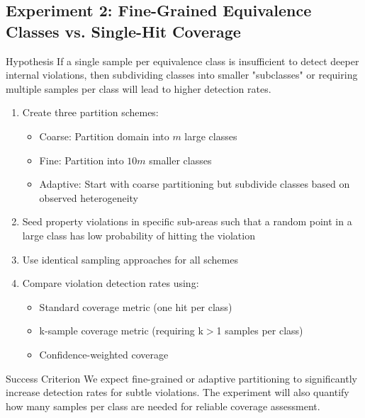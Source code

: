 \documentclass[11pt,a4paper]{article}
\begin{document}
\subsection{Experiment 2: Fine-Grained Equivalence Classes vs. Single-Hit Coverage}

\begin{theorembox}{Hypothesis}
If a single sample per equivalence class is insufficient to detect deeper internal violations, then subdividing classes into smaller "subclasses" or requiring multiple samples per class will lead to higher detection rates.
\end{theorembox}

\begin{tcolorbox}[
  colback=blue!5!white,
  colframe=blue!75!black,
  title=Experimental Design,
  fonttitle=\bfseries
]
\begin{enumerate}
\item Create three partition schemes:
   \begin{itemize}
   \item Coarse: Partition domain into $m$ large classes
   \item Fine: Partition into $10m$ smaller classes
   \item Adaptive: Start with coarse partitioning but subdivide classes based on observed heterogeneity
   \end{itemize}
\item Seed property violations in specific sub-areas such that a random point in a large class has low probability of hitting the violation
\item Use identical sampling approaches for all schemes
\item Compare violation detection rates using:
   \begin{itemize}
   \item Standard coverage metric (one hit per class)
   \item k-sample coverage metric (requiring k$>$1 samples per class)
   \item Confidence-weighted coverage
   \end{itemize}
\end{enumerate}
\end{tcolorbox}

\begin{definitionbox}{Success Criterion}
We expect fine-grained or adaptive partitioning to significantly increase detection rates for subtle violations. The experiment will also quantify how many samples per class are needed for reliable coverage assessment.
\end{definitionbox}
\end{document}
